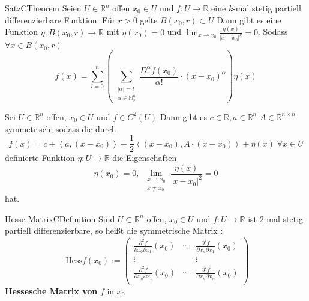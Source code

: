 \documentclass[11pt, a4paper]{memoir}
\begin{document}
\begin{ibox}[41]{Satz}{CTheorem}
    Seien $ U \in \mathbb{R}^n  $ offen $ x_0 \in U $ und $ f: U \to \mathbb{R}  $ eine $ k $-mal stetig partiell differenzierbare 
	Funktion. Für $ r>0 $ gelte $ B(x_0,r) \subset U$  Dann gibt es eine Funktion $ \eta : B \left( x_0, r \right) \to \mathbb{R}  $ 
	mit $ \eta \left(x_0\right)  = 0 $ und $ \lim_{ x \to x_0} \frac{\eta \left(x\right) }{|x-x_0|^{k}}  = 0 $. Sodass $ \forall  x \in 
	B \left( x_0, r \right) $ 
	$$ f(x) = \sum_{l=0}^{n} \left(\, \sum_{\substack{ |\alpha| = l \\ \alpha \in \mathbb{N}_{0}^{n} }} \frac{D^{\alpha }f
	\left(x_0\right) }{\alpha !} \cdot \left( x - x_0 \right) ^{\alpha }  \right) \eta \left(x\right)   $$
\end{ibox}
Sei $ U \in \mathbb{R}^n  $ offen, $ x_0 \in U $ und $ f \in  C^{2} \left(U\right)  $ Dann gibt es $ c \in \mathbb{R} , a \in \mathbb{R}^n $
$ A \in \mathbb{R}^{n \times n}  $ symmetrisch, sodass die durch 
$$ f \left(x\right)  = c + \left< a, \left( x - x_0 \right)  \right> + \frac{1}{2} \left<(x-x_0), A \cdot (x-x_0) \right> + 
\eta \left(x\right) \; \forall x \in U	$$ 
definierte Funktion $ \eta : U \to \mathbb{R}  $ die Eigenschaften 
$$ \eta \left(x_0\right)  = 0 , \; \lim_{ \substack{ x \to x_0 \\x \neq x_0 } } \frac{\eta \left(x\right) }{ |x - x_0|^{2}} = 0  $$
hat.
\begin{ibox}[]{Hesse Matrix}{CDefinition}
    Sind $ U \subset \mathbb{R}^n  $ offen, $ x_0 \in U $ und $ f: U \to \mathbb{R}  $ ist 2-mal stetig partiell differenzierbare, so
	heißt die symmetrische Matrix : 
	$$ \text{ Hess}f \left(x_0\right) := \begin{pmatrix}
		\frac{\partial ^{2} f}{\partial x_0 \partial x_1} \left(x_0\right) & \cdots    
	 	&\frac{\partial ^{2} f}{\partial x_n \partial x_1} \left(x_0\right) \\
		\vdots & & \vdots \\
		\frac{\partial ^{2} f}{\partial x_n \partial x_1} \left(x_0\right) & \cdots    
	 	&\frac{\partial ^{2} f}{\partial x_n \partial x_n} \left(x_0\right) \\
	\end{pmatrix}
	  $$
\textbf{Hessesche Matrix von} $ f \text{ in } x_0 $ 	
\end{ibox}
\end{document}
